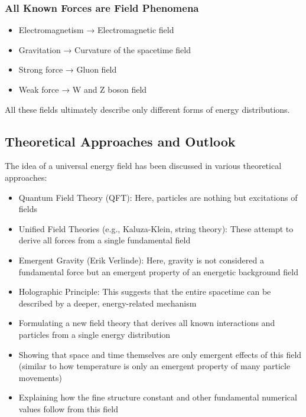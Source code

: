 \documentclass{article}
\begin{document}
\subsubsection{All Known Forces are Field Phenomena}
\begin{itemize}
	\item Electromagnetism → Electromagnetic field
	\item Gravitation → Curvature of the spacetime field
	\item Strong force → Gluon field
	\item Weak force → W and Z boson field
\end{itemize}

All these fields ultimately describe only different forms of energy distributions.

\subsection{Theoretical Approaches and Outlook}

The idea of a universal energy field has been discussed in various theoretical approaches:

\begin{itemize}
	\item Quantum Field Theory (QFT): Here, particles are nothing but excitations of fields
	\item Unified Field Theories (e.g., Kaluza-Klein, string theory): These attempt to derive all forces from a single fundamental field
	\item Emergent Gravity (Erik Verlinde): Here, gravity is not considered a fundamental force but an emergent property of an energetic background field
	\item Holographic Principle: This suggests that the entire spacetime can be described by a deeper, energy-related mechanism
\end{itemize}

\begin{itemize}
	\item Formulating a new field theory that derives all known interactions and particles from a single energy distribution
	\item Showing that space and time themselves are only emergent effects of this field (similar to how temperature is only an emergent property of many particle movements)
	\item Explaining how the fine structure constant and other fundamental numerical values follow from this field
\end{itemize}
\end{document}
